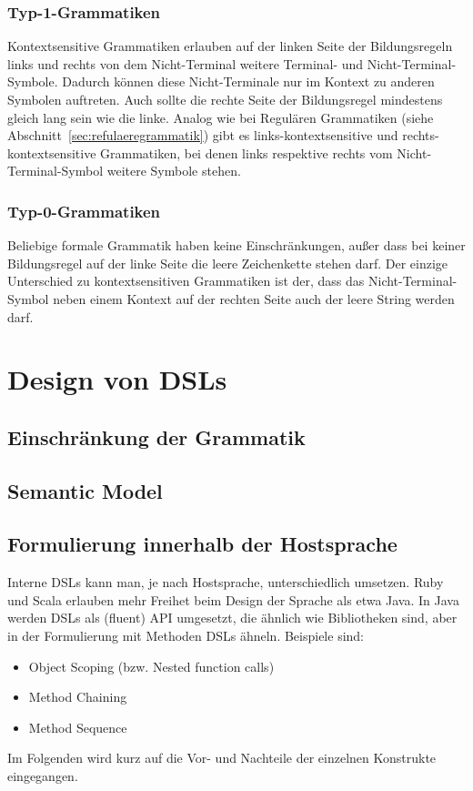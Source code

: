 \documentclass[../InterneDSLs.tex]{subfiles}
\begin{document}
\subsubsection{Typ-1-Grammatiken}\label{sec:kontextsensitivegrammatik}
Kontextsensitive Grammatiken erlauben auf der linken Seite der Bildungsregeln links und rechts von dem Nicht-Terminal weitere Terminal- und Nicht-Terminal-Symbole. Dadurch können diese Nicht-Terminale nur im Kontext zu anderen Symbolen auftreten. Auch sollte die rechte Seite der Bildungsregel mindestens gleich lang sein wie die linke. Analog wie bei Regulären Grammatiken (siehe Abschnitt~\ref{sec:refulaeregrammatik}) gibt es links-kontextsensitive und rechts-kontextsensitive Grammatiken, bei denen links respektive rechts vom Nicht-Terminal-Symbol weitere Symbole stehen.

\subsubsection{Typ-0-Grammatiken}\label{sec:beliebigegrammatik}
Beliebige formale Grammatik haben keine Einschränkungen, außer dass bei keiner Bildungsregel auf der linke Seite die leere Zeichenkette stehen darf. Der einzige Unterschied zu kontextsensitiven Grammatiken ist der, dass das Nicht-Terminal-Symbol neben einem Kontext auf der rechten Seite auch der leere String werden darf.


\section{Design von DSLs}

\subsection{Einschränkung der Grammatik}

\subsection{Semantic Model}

\subsection{Formulierung innerhalb der Hostsprache}
Interne DSLs kann man, je nach Hostsprache, unterschiedlich umsetzen. Ruby und Scala erlauben mehr Freihet beim Design der Sprache als etwa Java. In Java werden DSLs als (fluent) API umgesetzt, die ähnlich wie Bibliotheken sind, aber in der Formulierung mit Methoden DSLs ähneln. Beispiele sind:
\begin{itemize}
	\item Object Scoping (bzw. Nested function calls)
	\item Method Chaining
	\item Method Sequence
\end{itemize}
Im Folgenden wird kurz auf die Vor- und Nachteile der einzelnen Konstrukte eingegangen.
\end{document}
